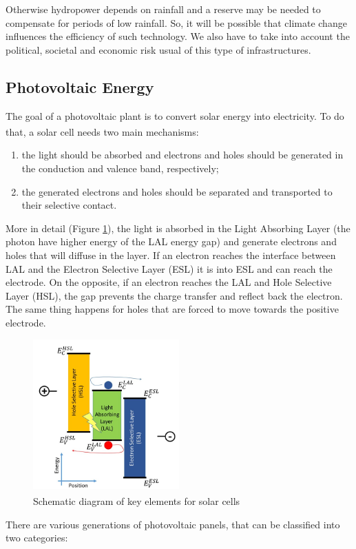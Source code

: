 Otherwise hydropower depends on rainfall and a reserve may be needed to compensate for periods of low rainfall. So, it will be possible that climate change influences the efficiency of such technology. We also have to take into account the political, societal and economic risk usual of this type of infrastructures.

\subsection{Photovoltaic Energy}
The goal of a photovoltaic plant is to convert solar energy into electricity. To do that, a solar cell needs two main mechanisms\textsuperscript{\cite{PV2020}}:

\begin{enumerate}
    \item the light should be absorbed and electrons and holes should be generated in the conduction and valence band, respectively;
    \item the generated electrons and holes should be separated and transported to their selective contact.
\end{enumerate}

More in detail (Figure \ref{fig:pv}), the light is absorbed in the Light Absorbing Layer (the photon have higher energy of the LAL energy gap) and generate electrons and holes that will diffuse in the layer. If an electron reaches the interface between LAL and the Electron Selective Layer (ESL) it is into ESL and can reach the electrode. On the opposite, if an electron reaches the LAL and Hole Selective Layer (HSL), the gap prevents the charge transfer and reflect back the electron. The same thing happens for holes that are forced to move towards the positive electrode.

\begin{figure}[h]
    \centering
    \includegraphics[width=0.5\textwidth]{Chapters/Pictures/PV_schematic_diagram.jpg}
    \caption{Schematic diagram of key elements for solar cells\textsuperscript{\cite{PV2020}}}
    \label{fig:pv}
\end{figure}
\newpage
There are various generations of photovoltaic panels, that can be classified into two categories:

